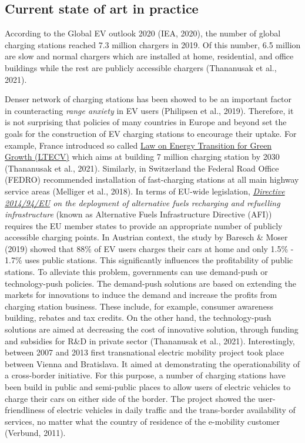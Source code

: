 \documentclass[
]{book}
\begin{document}
\hypertarget{current-state-of-art-in-practice-5}{%
\subsection*{Current state of art in practice}\label{current-state-of-art-in-practice-5}}

According to the Global EV outlook 2020 (IEA, 2020), the number of global charging stations reached 7.3 million chargers in 2019. Of this number, 6.5 million are slow and normal chargers which are installed at home, residential, and office buildings while the rest are publicly accessible chargers (Thananusak et al., 2021).

Denser network of charging stations has been showed to be an important factor in counteracting \emph{range anxiety} in EV users (Philipsen et al., 2019). Therefore, it is not surprising that policies of many countries in Europe and beyond set the goals for the construction of EV charging stations to encourage their uptake. For example, France introduced so called \href{https://www.iea.org/policies/8737-law-on-energy-transition-for-green-growth-ltecv}{Law on Energy Transition for Green Growth (LTECV)} which aims at building 7 million charging station by 2030 (Thananusak et al., 2021). Similarly, in Switzerland the Federal Road Office (FEDRO) recommended installation of fast-charging stations at all main highway service areas (Melliger et al., 2018). In terms of EU-wide legislation, \emph{\href{https://eur-lex.europa.eu/legal-content/EN/TXT/HTML/?uri=CELEX:32014L0094\&from=en}{Directive 2014/94/EU} on the deployment of alternative fuels recharging and refuelling infrastructure} (known as Alternative Fuels Infrastructure Directive (AFI)) requires the EU member states to provide an appropriate number of publicly accessible charging points.
In Austrian context, the study by Baresch \& Moser (2019) showed that 88\% of EV users charges their cars at home and only 1.5\% - 1.7\% uses public stations. This significantly influences the profitability of public stations. To alleviate this problem, governments can use demand-push or technology-push policies. The demand-push solutions are based on extending the markets for innovations to induce the demand and increase the profits from charging station business. These include, for example, consumer awareness building, rebates and tax credits. On the other hand, the technology-push solutions are aimed at decreasing the cost of innovative solution, through funding and subsidies for R\&D in private sector (Thananusak et al., 2021).
Interestingly, between 2007 and 2013 first transnational electric mobility project took place between Vienna and Bratislava. It aimed at demonstrating the operationability of a cross-border initiative. For this purpose, a number of charging stations have been build in public and semi-public places to allow users of electric vehicles to charge their cars on either side of the border. The project showed the user-friendliness of electric vehicles in daily traffic and the trans-border availability of services, no matter what the country of residence of the e-mobility customer (Verbund, 2011).
\end{document}
